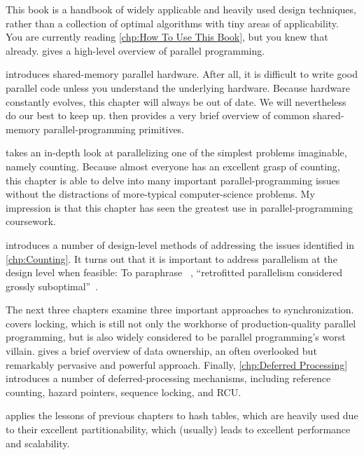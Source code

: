 This book is a handbook of widely applicable and heavily
used design techniques, rather than
a collection of optimal algorithms with tiny areas of applicability.
You are currently reading \cref{chp:How To Use This Book}, but
you knew that already.
 gives a high-level overview of parallel
programming.

 introduces shared-memory
parallel hardware.
After all, it is difficult to write good parallel code unless you
understand the underlying hardware.
Because hardware constantly evolves, this chapter will always be
out of date.
We will nevertheless do our best to keep up.
 then provides a very brief overview
of common shared-memory parallel-programming primitives.

 takes an in-depth look at parallelizing
one of the simplest problems imaginable, namely counting.
Because almost everyone has an excellent grasp of counting, this chapter
is able to delve into many important parallel-programming issues without
the distractions of more-typical computer-science problems.
My impression is that this chapter has seen the greatest use in
parallel-programming coursework.

introduces a number of design-level methods of addressing the issues
identified in \cref{chp:Counting}.
It turns out that it is important to address parallelism at
the design level when feasible:
To paraphrase ~\cite{Dijkstra:1968:LEG:362929.362947},
``retrofitted parallelism considered grossly
suboptimal''~\cite{PaulEMcKenney2012HOTPARsuboptimal}.

The next three chapters examine three important approaches to
synchronization.
 covers locking, which is still not only the
workhorse of production-quality parallel programming, but is also widely
considered to be parallel programming's worst villain.
 gives a brief overview of data ownership,
an often overlooked but remarkably pervasive and powerful approach.
Finally, \cref{chp:Deferred Processing} introduces a number of
deferred-processing mechanisms, including reference counting,
hazard pointers, sequence locking, and RCU\@.

 applies the lessons of previous
chapters to hash tables, which are heavily used due
to their excellent partitionability, which (usually) leads to excellent
performance and scalability.


